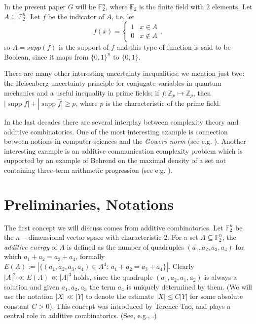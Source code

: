 \documentclass[12pt]{amsart}%
\DeclareMathOperator{\supp}{supp}
\theoremstyle{definition}
\begin{document}
In the present paper $G$ will be $\mathbb F^n_2$,  where $\mathbb{F}_2$ is the finite field with $2$ elements. Let $A\subseteq \mathbb F^n_2$. Let $f$ be the indicator of $A$, i.e. let
$$
f(x) = \left\{
     \begin{array}{lr}
       1 &  x \in A\\
       0 &  x \notin A
     \end{array}
\right.,
$$
so $A=supp(f)$ is the support of $f$ and this type of function is said to be Boolean, since it maps from $\{0,1\}^n$ to $\{0,1\}$.


There are many other interesting uncertainty inequalities; we mention just two: the Heisenberg uncertainty principle for conjugate variables in quantum mechanics and a useful inequality in prime fields; if $f: \mathbb{Z}_p\mapsto \mathbb{Z}_p$, then  $|\supp f| + |\supp \widehat{f}|\geq p$, where $p$ is the characteristic of the prime field.

In the last decades there are several interplay between complexity theory and additive combinatorics. One of the most interesting example is connection between notions in computer sciences and the {\it Gowers norm} (see e.g. \cite{3,6}).
Another interesting example is an additive communication complexity problem which is supported by an example of Behrend on the maximal density of a set not containing three-term arithmetic progression (see e.g. \cite{2}). 








\bigskip

\section{Preliminaries, Notations}

\medskip

The first concept we will discuss comes from additive combinatorics. Let $\mathbb F^n_2$ be the $n-$dimensional vector space with characteristic $2$.  For a set $A\subseteq \mathbb F^n_2$, the {\it additive energy} of $A$ is defined as the number of quadruples  $(a_1,a_2,a_3,a_4)$ for which $a_1+a_2=a_3+a_4$, formally $E(A):=|\{(a_1,a_2,a_3,a_4)\in A^4: \ a_1+a_2=a_3+a_4\}|$.
Clearly $|A|^2\ll E(A)\ll |A|^3$ holds, since the quadruple $(a_1,a_2,a_1,a_2)$ is always a solution and given $a_1,a_2,a_3$ the term $a_4$ is uniquely determined by them. (We will use the notation $|X|\ll |Y|$ to denote the estimate $|X|\leq C|Y|$ for some absolute constant $C>0$). This concept was introduced by Terence Tao, and plays a central role in additive combinatorics. (See, e.g., \cite{4,5}.)
\end{document}

